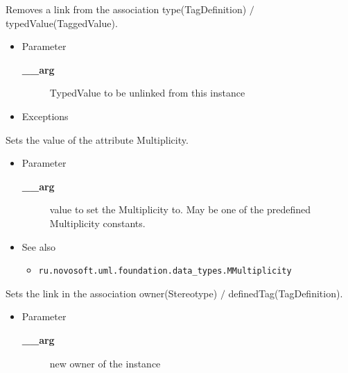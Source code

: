\begin{desc}Removes a link from the association type(TagDefinition)
 $/$ typedValue(TaggedValue).
\begin{itemize}
\item{Parameter
  \begin{description}
   \item[{\bf \_\_arg}]{TypedValue to be unlinked from this instance}
  \end{description}}
\end{itemize}
\begin{itemize}
\item{{Exceptions}
}
\end{itemize}
\end{desc}

\begin{desc}Sets the value of the attribute Multiplicity.
\begin{itemize}
\item{Parameter
  \begin{description}
   \item[{\bf \_\_arg}]{value to set the Multiplicity to. May be one of the
              predefined Multiplicity constants.}
  \end{description}}
\end{itemize}
\begin{itemize}
\item{{See also}
  \begin{itemize}
   \item{{\tt ru.novosoft.uml.foundation.data\_types.MMultiplicity} {
}
}
  \end{itemize}
}
\end{itemize}
\end{desc}

\begin{desc}Sets the link in the association owner(Stereotype)
 $/$ definedTag(TagDefinition).
\begin{itemize}
\item{Parameter
  \begin{description}
   \item[{\bf \_\_arg}]{new owner of the instance}
  \end{description}}
\end{itemize}
\end{desc}

